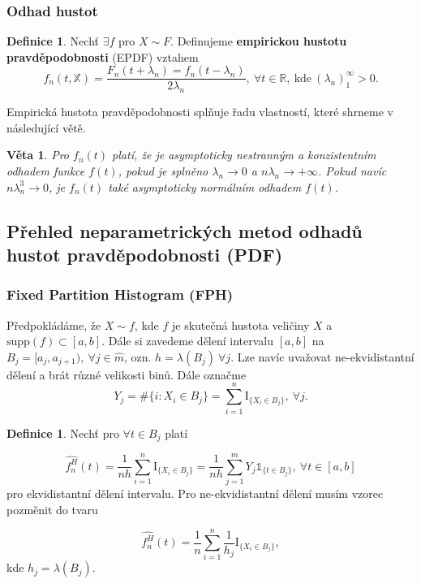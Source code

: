 \documentclass{article}
\newtheorem{theorem}[subsubsection]{Věta}
\theoremstyle{remark}
\theoremstyle{plain}
\theoremstyle{definition}
\newtheorem{definition}[subsubsection]{Definice}
\theoremstyle{remark}
\begin{document}
\subsubsection{Odhad hustot}

\begin{definition}
Nechť $\exists f$ pro $X \sim F$. Definujeme \textbf{empirickou hustotu pravděpodobnosti} (EPDF) vztahem
$$
f_n\left(t,\mathbb{X}\right) = \frac{F_n\left(t + \lambda_n\right) = f_n\left(t - \lambda_n\right)}{2\lambda_n}, \ \forall t \in \mathbb{R}, \ \text{kde} \ \left(\lambda_n\right)_1^{\infty} > 0.
$$
\end{definition}

Empirická hustota pravděpodobnosti splňuje řadu vlastností, které shrneme v následující větě.

\begin{theorem}
Pro $f_n(t)$ platí, že je asymptoticky nestranným a konzistentním odhadem funkce $f(t)$, pokud je splněno $\lambda_n \rightarrow 0$ a $n\lambda_n \rightarrow +\infty$. Pokud navíc $n\lambda_n^3 \rightarrow 0$, je $f_n(t)$ také asymptoticky normálním odhadem $f(t)$.
\end{theorem}

\subsection{Přehled neparametrických metod odhadů hustot pravděpodobnosti (PDF)}

\subsubsection{Fixed Partition Histogram (FPH)}

Předpokládáme, že $X \sim f$, kde $f$ je skutečná hustota veličiny $X$ a $\text{supp}(f) \subset [a,b]$. Dále si zavedeme dělení intervalu $[a,b]$ na $B_j = [a_j,a_{j+1}), \ \forall j \in \hat{m}$, ozn. $h=\lambda(B_j) \ \forall j$. Lze navíc uvažovat ne-ekvidistantní dělení a brát různé velikosti binů. Dále označme
$$
Y_j = \#\{i:X_i \in B_j\} = \sum_{i=1}^n \text{I}_{\{X_i \in B_j\}}, \ \forall j.
$$

\begin{definition}
Nechť pro $\forall t \in B_j$ platí

$$
\hat{f_n^H}(t) = \frac{1}{nh} \sum_{i=1}^n \text{I}_{\{X_i \in B_j\}} = \frac{1}{nh} \sum_{j=1}^m Y_j \mathbb{1}_{\{t \in B_j\}}, \ \forall t \in [a,b]
$$
pro ekvidistantní dělení intervalu. Pro ne-ekvidistantní dělení musím vzorec pozměnit do tvaru

$$
\hat{f_n^H}(t) = \frac{1}{n} \sum_{i=1}^n \frac{1}{h_j} \text{I}_{\{X_i \in B_j\}},
$$
kde $h_j = \lambda(B_j)$.

\end{definition}
\end{document}
